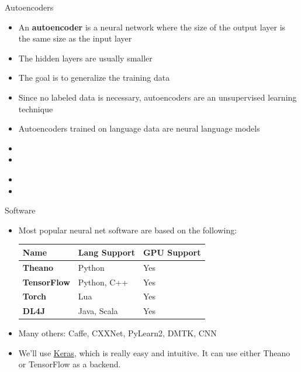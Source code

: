 \documentclass[xcolor=pdftex,x11names,table,hyperref]{beamer}
\begin{document}
\begin{frame}{Autoencoders}
\begin{itemize}
	\item An \textbf{autoencoder} is a neural network where the size of the output layer is the same size as the input layer
	\item The hidden layers are usually smaller
	\item The goal is to generalize the training data
	\item Since no labeled data is necessary, autoencoders are an unsupervised learning technique
	\item Autoencoders trained on language data are neural language models
\end{itemize}
\end{frame}

\begin{frame}{}
\begin{itemize}
	\item 
	\item 
\end{itemize}
\end{frame}

\begin{frame}{}
\begin{itemize}
	\item 
	\item 
\end{itemize}
\end{frame}

\begin{frame}{Software}
\begin{itemize}
	\item Most popular neural net software are based on the following: \\[1.0em]
\begin{tabular}{lll}
	\bf Name & \bf Lang Support & \bf GPU Support \\
	\hline
	\bf Theano & Python & Yes \\
	\bf TensorFlow & Python, C++ & Yes \\
	\bf Torch & Lua & Yes \\
	\bf DL4J & Java, Scala & Yes \\
\end{tabular}
\vspace*{1.0em}
\pause
\item Many others: Caffe, CXXNet, PyLearn2, DMTK, CNN
\pause
\item We'll use \href{http://keras.io}{Keras}, which is really easy and intuitive.  It can use either Theano or TensorFlow as a backend.
\end{itemize}
\end{frame}
\end{document}
